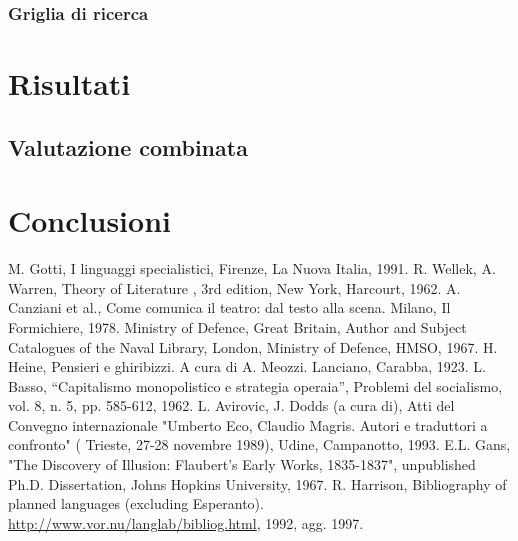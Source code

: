 \documentclass[a4paper,12pt]{report}
\begin{document}
\subsection{Griglia di ricerca}


% 
% 
\chapter{Risultati}
\label{cap3}
\section{Valutazione combinata}

% 
% 
\chapter{Conclusioni}
\label{cap4}

%
%
\begin{thebibliography}{00}
%
M. Gotti, I linguaggi specialistici, Firenze, La Nuova Italia, 1991.
%
R. Wellek, A. Warren, Theory of Literature , 3rd edition, New York, Harcourt, 1962.
%
A. Canziani et al., Come comunica il teatro: dal testo alla scena. Milano, Il Formichiere, 1978.
%
Ministry of Defence, Great Britain, Author and Subject Catalogues of the Naval Library, London, Ministry of Defence, HMSO, 1967.
%
H. Heine, Pensieri e ghiribizzi. A cura di A. Meozzi. Lanciano, Carabba, 1923.
%
L. Basso, ``Capitalismo monopolistico e strategia operaia'', Problemi del socialismo, vol. 8, n. 5, pp. 585-612, 1962.
%
L. Avirovic, J. Dodds (a cura di), Atti del Convegno internazionale "Umberto Eco, Claudio Magris. Autori e traduttori a confronto" ( Trieste, 27-28 novembre 1989), Udine, Campanotto, 1993.
%
E.L. Gans, "The Discovery of Illusion: Flaubert's Early Works, 1835-1837", unpublished Ph.D. Dissertation, Johns Hopkins University, 1967.
%
R. Harrison, Bibliography of planned languages (excluding Esperanto).  \url{http://www.vor.nu/langlab/bibliog.html}, 1992, agg. 1997.
%
\end{thebibliography}
% 
\end{document}

